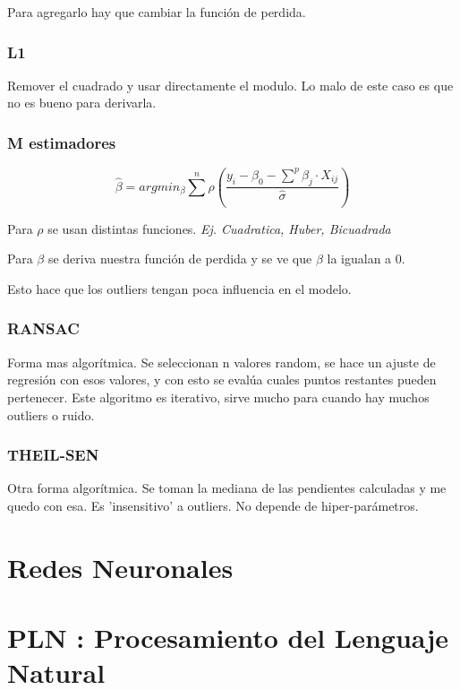 \documentclass[titlepage,a4paper]{article}
\begin{document}

Para agregarlo hay que cambiar la función de perdida.

\subsubsection{L1}
Remover el cuadrado y usar directamente el modulo. Lo malo de este caso es que no es bueno para derivarla.

\subsubsection{M estimadores}
\begin{equation}
    \hat{\beta} = arg min_\beta \sum^{n} \rho(\frac{ y_{i}-\beta_0-\sum^{p}\beta_j \cdot X_{ij}}{\hat{\sigma}})
\end{equation}

Para $\rho$ se usan distintas funciones. \textit{Ej. Cuadratica, Huber, Bicuadrada}

Para $\beta$ se deriva nuestra función de perdida y se ve que $\beta$ la igualan a 0.

Esto hace que los outliers tengan poca influencia en el modelo.


\subsubsection{RANSAC}
Forma mas algorítmica. Se seleccionan n valores random, se hace un ajuste de regresión con esos valores, y con esto se evalúa cuales puntos restantes pueden pertenecer. Este algoritmo es iterativo, sirve mucho para cuando hay muchos outliers o ruido.


\subsubsection{THEIL-SEN}
Otra forma algorítmica. Se toman la mediana de las pendientes calculadas y me quedo con esa. Es 'insensitivo' a outliers. No depende de hiper-parámetros.


\section{Redes Neuronales}


\section{PLN : Procesamiento del Lenguaje Natural}
\end{document}
